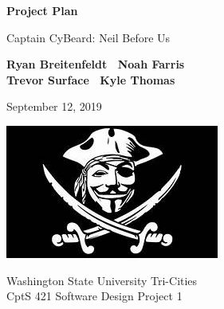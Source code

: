 \begin{titlepage}
    \begin{center}
        \vspace*{1cm}

        \Huge
        \textbf{Project Plan}

        \vspace{.5cm}
        \LARGE
        Captain CyBeard: Neil Before Us

        \vspace{1cm}

        \textbf{Ryan Breitenfeldt \textbar\ Noah Farris\\ Trevor Surface \textbar\ Kyle Thomas}

        \vspace{.2cm}
        \Large
        September 12, 2019

        \vspace{2cm}
        \includegraphics[scale=1]{logo}

        \vfill

        Washington State University Tri-Cities\\
        CptS 421 Software Design Project 1

    \end{center}
\end{titlepage}

